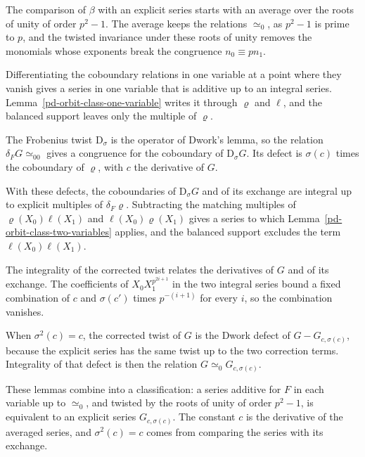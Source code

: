 The comparison of $\beta$ with an explicit series starts with an average over the roots of unity of order
$p^2-1$. The average keeps the relations $\simeq_0$, as $p^2-1$ is prime to $p$, and the twisted
invariance under these roots of unity removes the monomials whose exponents break the congruence
$n_0\equiv pn_1$.

Differentiating the coboundary relations in one variable at a point where they vanish gives a series in
one variable that is additive up to an integral series. Lemma~\ref{pd-orbit-class-one-variable} writes it
through $\varrho$ and $\ell$, and the balanced support leaves only the multiple of $\varrho$.

The Frobenius twist $\mathrm D_\sigma$ is the operator of Dwork's lemma, so the relation
$\delta_FG\simeq_00$ gives a congruence for the coboundary of $\mathrm D_\sigma G$. Its defect is
$\sigma(c)$ times the coboundary of $\varrho$, with $c$ the derivative of $G$.

With these defects, the coboundaries of $\mathrm D_\sigma G$ and of its exchange are integral up to
explicit multiples of $\delta_F\varrho$. Subtracting the matching multiples of $\varrho(X_0)\ell(X_1)$
and $\ell(X_0)\varrho(X_1)$ gives a series to which Lemma~\ref{pd-orbit-class-two-variables} applies, and
the balanced support excludes the term $\ell(X_0)\ell(X_1)$.

The integrality of the corrected twist relates the derivatives of $G$ and of its exchange. The
coefficients of $X_0X_1^{p^{2i+1}}$ in the two integral series bound a fixed combination of $c$ and
$\sigma(c')$ times $p^{-(i+1)}$ for every $i$, so the combination vanishes.

When $\sigma^2(c)=c$, the corrected twist of $G$ is the Dwork defect of $G-G_{c,\sigma(c)}$, because the
explicit series has the same twist up to the two correction terms. Integrality of that defect is then
the relation $G\simeq_0G_{c,\sigma(c)}$.

These lemmas combine into a classification: a series additive for $F$ in each variable up to $\simeq_0$,
and twisted by the roots of unity of order $p^2-1$, is equivalent to an explicit series
$G_{c,\sigma(c)}$. The constant $c$ is the derivative of the averaged series, and $\sigma^2(c)=c$ comes
from comparing the series with its exchange.


